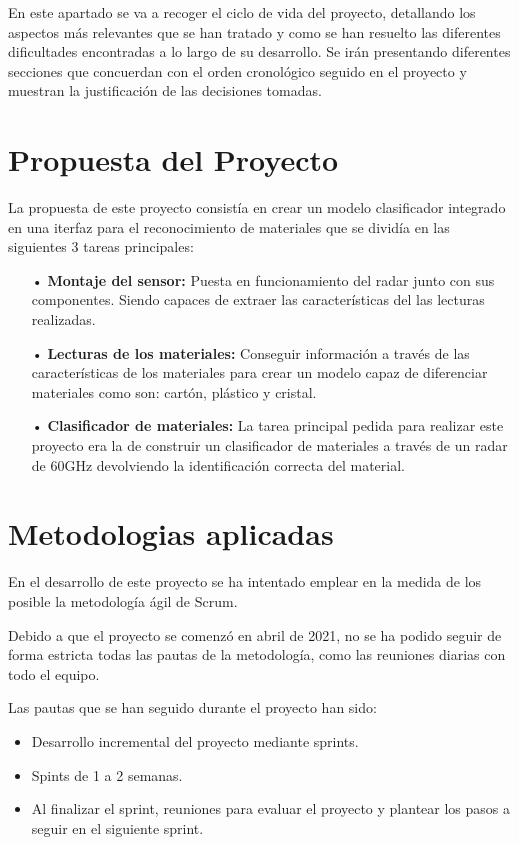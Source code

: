
En este apartado se va a recoger el ciclo de vida del proyecto, detallando los aspectos más relevantes que se han tratado y como se han resuelto las diferentes dificultades encontradas a lo largo de su desarrollo. Se irán presentando diferentes secciones que concuerdan con el orden cronológico seguido en el proyecto y muestran la justificación de las decisiones tomadas.

\section{Propuesta del Proyecto}

La propuesta de este proyecto consistía en crear un modelo clasificador integrado en una iterfaz para el reconocimiento de materiales que se dividía en las siguientes 3 tareas principales:

\begin{itemize}
\item[•] \textbf{Montaje del sensor:} Puesta en funcionamiento del radar junto con sus componentes. Siendo capaces de extraer las características del las lecturas realizadas.

\item[•] \textbf{Lecturas de los materiales:} Conseguir información a través de las características de los materiales para crear un modelo capaz de diferenciar materiales como son: cartón, plástico y cristal.

\item[•] \textbf{Clasificador de materiales:} La tarea principal pedida para realizar este proyecto era la de construir un clasificador de materiales a través de un radar de 60GHz devolviendo la identificación correcta del material.
\end{itemize}

\section{Metodologias aplicadas}

En el desarrollo de este proyecto se ha intentado emplear en la medida de los posible la metodología ágil de Scrum.

Debido a que el proyecto se comenzó en abril de 2021, no se ha podido seguir de forma estricta todas las pautas de la metodología, como las reuniones diarias con todo el equipo. 

Las pautas que se han seguido durante el proyecto han sido:
\begin{itemize}
\item Desarrollo incremental del proyecto mediante sprints. 
\item Spints de 1 a 2 semanas. 
\item Al finalizar el sprint, reuniones para evaluar el proyecto y plantear los pasos a seguir en el siguiente sprint.
\end{itemize}

